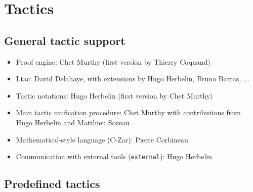\documentclass{article}
\begin{document}
\section{Tactics}

\subsection{General tactic support}

\begin{itemize}
\item Proof engine: Chet Murthy (first version by Thierry Coquand)
\item Ltac: David Delahaye, with extensions by Hugo Herbelin, Bruno Barras, ...
\item Tactic notations: Hugo Herbelin (first version by Chet Murthy)
\item Main tactic unification procedure: Chet Murthy with
  contributions from Hugo Herbelin and Matthieu Sozeau
\item Mathematical-style language (C-Zar): Pierre Corbineau
\item Communication with external tools (\texttt{external}): Hugo Herbelin

\end{itemize}

\subsection{Predefined tactics}
\end{document}
